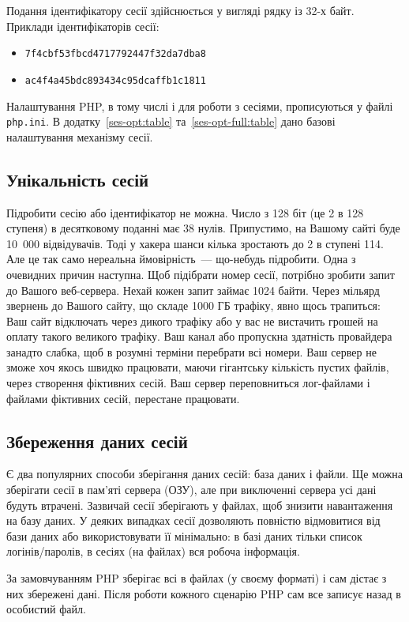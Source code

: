 Подання ідентифікатору сесії здійснюється у вигляді рядку із 32-х байт. Приклади ідентифікаторів сесії:

\begin{itemize}
\item \verb'7f4cbf53fbcd4717792447f32da7dba8'
\item \verb'ac4f4a45bdc893434c95dcaffb1c1811'
\end{itemize}

Налаштування PHP, в тому числі і для роботи з сесіями, прописуються у файлі \verb'php.ini'. В додатку~\ref{ses-opt:table} та~\ref{ses-opt-full:table} дано базові налаштування механізму сесії.

\subsection*{Унікальність сесій}
Підробити сесію або ідентифікатор не можна. Число з 128 біт (це 2 в 128 ступеня) в десятковому поданні має 38 нулів. Припустимо, на Вашому сайті буде 10~000 відвідувачів. Тоді у хакера шанси кілька зростають до 2 в ступені 114. Але це так само нереальна ймовірність~--- що-небудь підробити. Одна з очевидних причин наступна. Щоб підібрати номер сесії, потрібно зробити запит до Вашого веб-сервера. Нехай кожен запит займає 1024 байти. Через мільярд звернень до Вашого сайту, що складе 1000 ГБ трафіку, явно щось трапиться: Ваш сайт відключать через дикого трафіку або у вас не вистачить грошей на оплату такого великого трафіку. Ваш канал або пропускна здатність провайдера занадто слабка, щоб в розумні терміни перебрати всі номери. Ваш сервер не зможе хоч якось швидко працювати, маючи гігантську кількість пустих файлів, через створення фіктивних сесій. Ваш сервер переповниться лог-файлами і файлами фіктивних сесій, перестане працювати.

\subsection*{Збереження даних сесій}
Є два популярних способи зберігання даних сесій: база даних і файли. Ще можна зберігати сесії в пам'яті сервера (ОЗУ), але при виключенні сервера усі дані будуть втрачені. Зазвичай сесії зберігають у файлах, щоб знизити навантаження на базу даних. У деяких випадках сесії дозволяють повністю відмовитися від бази даних або використовувати її мінімально: в базі даних тільки список логінів/паролів, в сесіях (на файлах) вся робоча інформація.

За замовчуванням PHP зберігає всі в файлах (у своєму форматі) і сам дістає з них збережені дані. Після роботи кожного сценарію PHP сам все записує назад в особистий файл.

